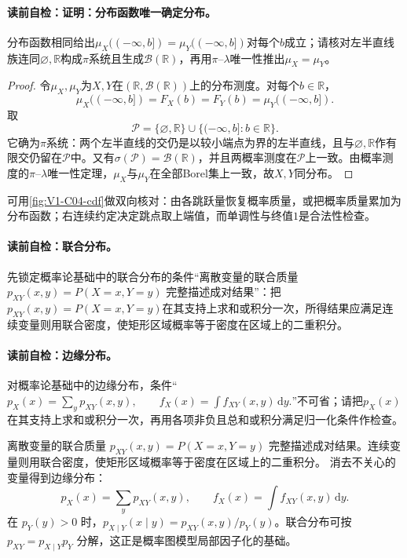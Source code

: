 \paragraph{读前自检：证明：分布函数唯一确定分布。}分布函数相同给出$\mu_X(( -\infty,b])=\mu_Y(( -\infty,b])$对每个$b$成立；请核对左半直线族连同$\varnothing,\mathbb R$构成$\pi$系统且生成$\mathcal B(\mathbb R)$，再用$\pi$--$\lambda$唯一性推出$\mu_X=\mu_Y$。\par

\begin{proof}
令$\mu_X,\mu_Y$为$X,Y$在$(\mathbb R,\mathcal B(\mathbb R))$上的分布测度。对每个$b\in\mathbb R$，
\[
\mu_X(( -\infty,b])=F_X(b)=F_Y(b)=\mu_Y(( -\infty,b]).
\]
取
\[
\mathcal P=\{\varnothing,\mathbb R\}\cup
\{(-\infty,b]:b\in\mathbb R\}.
\]
它确为$\pi$系统：两个左半直线的交仍是以较小端点为界的左半直线，且与$\varnothing,\mathbb R$作有限交仍留在$\mathcal P$中。又有$\sigma(\mathcal P)=\mathcal B(\mathbb R)$，并且两概率测度在$\mathcal P$上一致。由概率测度的$\pi$--$\lambda$唯一性定理，$\mu_X$与$\mu_Y$在全部Borel集上一致，故$X,Y$同分布。
\end{proof}

\label{struct:V1-C04-CH19}

可用\cref{fig:V1-C04-cdf}做双向核对：由各跳跃量恢复概率质量，或把概率质量累加为分布函数；右连续约定决定跳点取上端值，而单调性与终值$1$是合法性检查。


\paragraph{读前自检：联合分布。}先锁定概率论基础中的联合分布的条件“离散变量的联合质量 $p_{XY}(x,y)=P(X=x,Y=y)$ 完整描述成对结果”：把$p_{XY}(x,y)=P(X=x,Y=y)$在其支持上求和或积分一次，所得结果应满足连续变量则用联合密度，使矩形区域概率等于密度在区域上的二重积分。\par
\paragraph{读前自检：边缘分布。}对概率论基础中的边缘分布，条件“$p_X(x)=\sum_y p_{XY}(x,y),\qquad f_X(x)=\int f_{XY}(x,y)\,\mathrm dy.$”不可省；请把$p_X(x)$在其支持上求和或积分一次，再用各项非负且总和或积分满足归一化条件作检查。\par

离散变量的联合质量 $p_{XY}(x,y)=P(X=x,Y=y)$ 完整描述成对结果。连续变量则用联合密度，使矩形区域概率等于密度在区域上的二重积分。
消去不关心的变量得到边缘分布：
\[
p_X(x)=\sum_y p_{XY}(x,y),\qquad f_X(x)=\int f_{XY}(x,y)\,\mathrm dy.
\]
在 $p_Y(y)>0$ 时，$p_{X\mid Y}(x\mid y)=p_{XY}(x,y)/p_Y(y)$。联合分布可按 $p_{XY}=p_{X\mid Y}p_Y$ 分解，这正是概率图模型局部因子化的基础。

